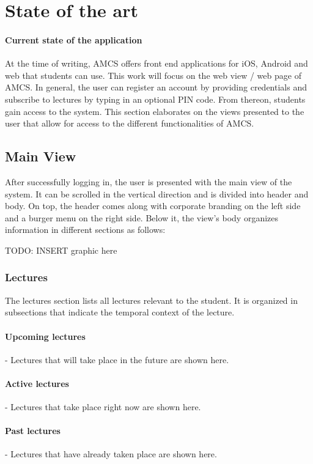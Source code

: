 \documentclass{sigplanconf}
\begin{document}
\section{State of the art}
\paragraph{Current state of the application}
At the time of writing, AMCS offers front end applications for iOS, Android and web that students can use. This work will focus on the web view / web page of AMCS. In general, the user can register an account by providing credentials and subscribe to lectures by typing in an optional PIN code. From thereon, students gain access to the system. This section elaborates on the views presented to the user that allow for access to the different functionalities of AMCS. 

\subsection{Main View}
After successfully logging in, the user is presented with the main view of the system.
It can be scrolled in the vertical direction and is divided into header and body. On top, the header comes along with corporate branding on the left side and a burger menu on the right side. Below it, the view's body organizes information in different sections as follows:


TODO: INSERT graphic here

\subsubsection{Lectures}

The lectures section lists all lectures relevant to the student. It is organized in subsections that indicate the temporal context of the lecture.

\paragraph{Upcoming lectures} - Lectures that will take place in the future are shown here.
\paragraph{Active lectures} - Lectures that take place right now are shown here.
\paragraph{Past lectures} - Lectures that have already taken place are shown here.
\end{document}
